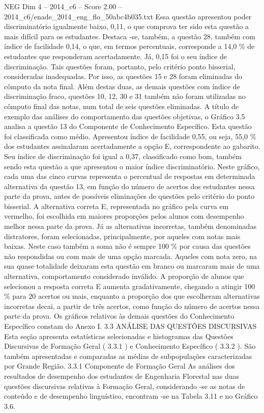 \begin{textsample}{NEG Dim 4 – 2014\_c6 – Score 2.00 – 2014\_c6/enade\_2014\_eng\_flo\_50abc4b035.txt}
Essa questão apresentou poder discriminatório igualmente baixo, 0,11, o que comprova ter sido esta questão a mais difícil para os estudantes.
Destaca -se, também, a questão 28, também com índice de facilidade 0,14, o que, em termos percentuais, corresponde a 14,0 \% de estudantes que responderam acertadamente.
Já, 0,15 foi o seu índice de discriminação.
Tais questões foram, portanto, pelo critério ponto bisserial, consideradas inadequadas.
Por isso, as questões 15 e 28 foram eliminadas do cômputo da nota final.
Além destas duas, as demais questões com índice de discriminação fraco, questões 10, 12, 30 e 31 também não foram utilizadas no cômputo final das notas, num total de seis questões eliminadas.
A título de exemplo das análises do comportamento das questões objetivas, o Gráfico 3.5 analisa a questão 13 do Componente de Conhecimento Específico.
Esta questão foi classificada como médio.
Apresentou índice de facilidade 0,55, ou seja, 55,0 \% dos estudantes assinalaram acertadamente a opção E, correspondente ao gabarito.
Seu índice de discriminação foi igual a 0,37, classificado como bom, também sendo esta questão a que apresentou o maior índice discriminatório.
Neste gráfico, cada uma das cinco curvas representa o percentual de respostas em determinada alternativa da questão 13, em função do número de acertos dos estudantes nessa parte da prova, antes de possíveis eliminações de questões pelo critério do ponto bisserial.
A alternativa correta E, representada no gráfico pela curva em vermelho, foi escolhida em maiores proporções pelos alunos com desempenho melhor nessa parte da prova.
Já as alternativas incorretas, também denominadas distratores, foram selecionadas, principalmente, por aqueles com notas mais baixas.
Neste caso também a soma não é sempre 100 \% por causa das questões não respondidas ou com mais de uma opção marcada.
Aqueles com nota zero, na sua quase totalidade deixaram esta questão em branco ou marcaram mais de uma alternativa, comportamento considerado inválido.
A proporção de alunos que selecionou a resposta correta E aumenta gradativamente, chegando a atingir 100 \% para 20 acertos ou mais, enquanto a proporção dos que escolheram alternativas incorretas decai, a partir de três acertos, como função do número de acertos nessa parte da prova.
Os gráficos relativos às demais questões do Conhecimento Específico constam do Anexo I. 3.3 ANÁLISE DAS QUESTÕES DISCURSIVAS Esta seção apresenta estatísticas selecionadas e histogramas das Questões Discursivas de Formação Geral ( 3.3.1 ) e Conhecimento Específico ( 3.3.2 ).
São também apresentadas e comparadas as médias de subpopulações caracterizadas por Grande Região. 3.3.1 Componente de Formação Geral As análises dos resultados de desempenho dos estudantes de Engenharia Florestal nas duas questões discursivas relativas à Formação Geral, considerando -se as notas de conteúdo e de desempenho linguístico, encontram -se na Tabela 3.11 e no Gráfico 3.6.

\end{textsample}
